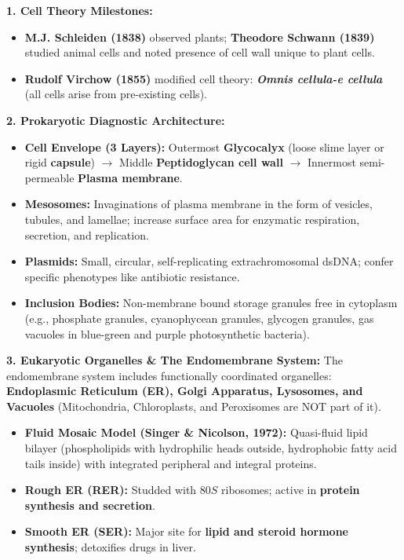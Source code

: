 \documentclass[10pt,a4paper]{article}
\begin{document}
\begin{conceptbox}
\textbf{1. Cell Theory Milestones:}
\begin{itemize}
  \item \textbf{M.J. Schleiden (1838)} observed plants; \textbf{Theodore Schwann (1839)} studied animal cells and noted presence of cell wall unique to plant cells.
  \item \textbf{Rudolf Virchow (1855)} modified cell theory: \textbf{\textit{Omnis cellula-e cellula}} (all cells arise from pre-existing cells).
\end{itemize}
\textbf{2. Prokaryotic Diagnostic Architecture:}
\begin{itemize}
  \item \textbf{Cell Envelope (3 Layers):} Outermost \textbf{Glycocalyx} (loose slime layer or rigid \textbf{capsule}) $\to$ Middle \textbf{Peptidoglycan cell wall} $\to$ Innermost semi-permeable \textbf{Plasma membrane}.
  \item \textbf{Mesosomes:} Invaginations of plasma membrane in the form of vesicles, tubules, and lamellae; increase surface area for enzymatic respiration, secretion, and replication.
  \item \textbf{Plasmids:} Small, circular, self-replicating extrachromosomal dsDNA; confer specific phenotypes like antibiotic resistance.
  \item \textbf{Inclusion Bodies:} Non-membrane bound storage granules free in cytoplasm (e.g., phosphate granules, cyanophycean granules, glycogen granules, gas vacuoles in blue-green and purple photosynthetic bacteria).
\end{itemize}
\textbf{3. Eukaryotic Organelles \& The Endomembrane System:}
The endomembrane system includes functionally coordinated organelles: \textbf{Endoplasmic Reticulum (ER), Golgi Apparatus, Lysosomes, and Vacuoles} (Mitochondria, Chloroplasts, and Peroxisomes are NOT part of it).
\begin{itemize}
  \item \textbf{Fluid Mosaic Model (Singer \& Nicolson, 1972):} Quasi-fluid lipid bilayer (phospholipids with hydrophilic heads outside, hydrophobic fatty acid tails inside) with integrated peripheral and integral proteins.
  \item \textbf{Rough ER (RER):} Studded with $80S$ ribosomes; active in \textbf{protein synthesis and secretion}.
  \item \textbf{Smooth ER (SER):} Major site for \textbf{lipid and steroid hormone synthesis}; detoxifies drugs in liver.

\end{itemize}
\end{conceptbox}
\end{document}

